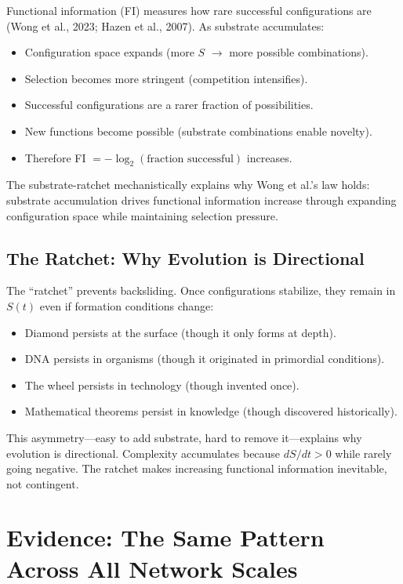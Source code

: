 \documentclass[12pt,a4paper]{article}
\begin{document}
Functional information (FI) measures how rare successful configurations are (Wong et al., 2023; Hazen et al., 2007). As substrate accumulates:

\begin{itemize}
    \item Configuration space expands (more $S$ $\rightarrow$ more possible combinations).
    \item Selection becomes more stringent (competition intensifies).
    \item Successful configurations are a rarer fraction of possibilities.
    \item New functions become possible (substrate combinations enable novelty).
    \item Therefore FI $= -\log_2(\text{fraction successful})$ increases.
\end{itemize}

The substrate-ratchet mechanistically explains why Wong et al.'s law holds: substrate accumulation drives functional information increase through expanding configuration space while maintaining selection pressure.

\subsection{The Ratchet: Why Evolution is Directional}

The ``ratchet'' prevents backsliding. Once configurations stabilize, they remain in $S(t)$ even if formation conditions change:

\begin{itemize}
    \item Diamond persists at the surface (though it only forms at depth).
    \item DNA persists in organisms (though it originated in primordial conditions).
    \item The wheel persists in technology (though invented once).
    \item Mathematical theorems persist in knowledge (though discovered historically).
\end{itemize}

This asymmetry---easy to add substrate, hard to remove it---explains why evolution is directional. Complexity accumulates because $dS/dt > 0$ while rarely going negative. The ratchet makes increasing functional information inevitable, not contingent.

\section{Evidence: The Same Pattern Across All Network Scales}
\end{document}
